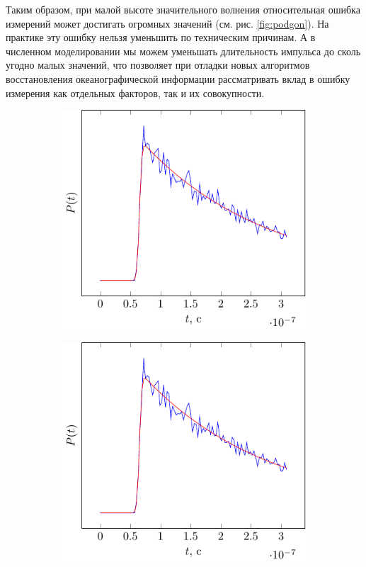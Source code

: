 Таким образом, при малой высоте значительного волнения относительная ошибка
измерений может достигать огромных значений (см. рис. \ref{fig:podgon}). На
практике эту ошибку нельзя уменьшить по техническим причинам. А в численном
моделировании мы можем уменьшать длительность импульса до сколь угодно малых
значений, что позволяет при отладки новых алгоритмов восстановления
океанографической информации рассматривать вклад в ошибку измерения как
отдельных факторов, так и их совокупности.


\begin{figure}[H]
    \centering
    \begin{subfigure}{0.49\linewidth}
        \centering
        \includegraphics[width=\linewidth,page=1]{fig/retracking/model}
    \end{subfigure}
    \begin{subfigure}{0.49\linewidth}
        \centering
        \includegraphics[width=\linewidth,page=3]{fig/retracking/model}

\end{subfigure}
\end{figure}
